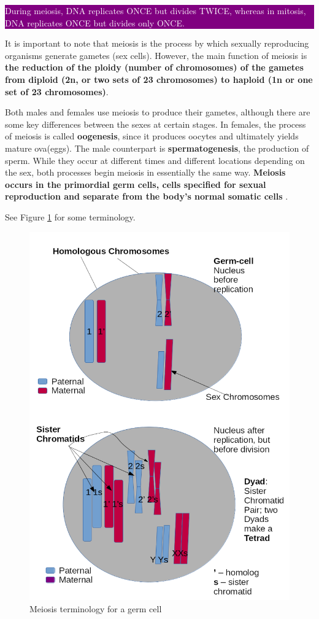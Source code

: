 \documentclass[12pt]{article}
\newcommand{\ctext}[3]{
    \colorbox{#2}{\parbox{0.9\textwidth}{\textcolor{#1}{#3}}}
}
\begin{document}
\ctext{white}{purple}{During meiosis, DNA replicates ONCE but divides TWICE, whereas in mitosis, DNA replicates ONCE but divides only ONCE.}

It is important to note that \cite{embryo-project} meiosis is the process by which sexually reproducing organisms generate gametes (sex cells). However, the main function of meiosis is \textbf{the reduction of the ploidy (number of chromosomes) of the gametes from diploid (2n, or two sets of 23 chromosomes) to haploid (1n or one set of 23 chromosomes)}.

Both males and females use meiosis to produce their gametes, although there are some key differences between the sexes at certain stages. In females, the process of meiosis is called \textbf{oogenesis}, since it produces oocytes and ultimately yields mature ova(eggs). The male counterpart is \textbf{spermatogenesis}, the production of sperm. While they occur at different times and different locations depending on the sex, both processes begin meiosis in essentially the same way. \textbf{Meiosis occurs in the primordial germ cells, cells specified for sexual reproduction and separate from the body’s normal somatic cells}  \cite{embryo-project}.

See Figure \ref{fig: meiosis-1} for some terminology.

\begin{figure}[h!]
    \centering
    \includegraphics[scale=0.3]{meiosis-1.png}
    \caption{Meiosis terminology for a germ cell}
    \label{fig: meiosis-1}
\end{figure}
\end{document}
